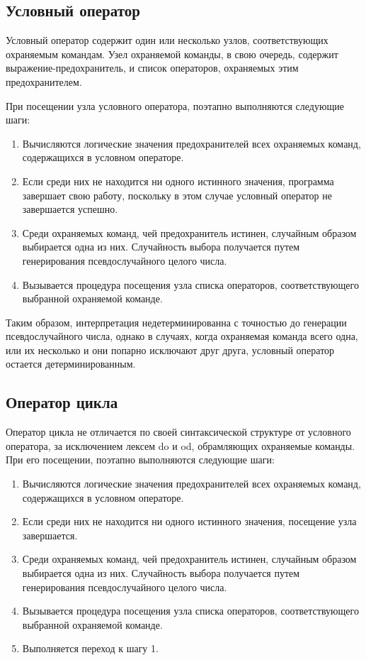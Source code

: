 \subsection{Условный оператор}
Условный оператор содержит один или несколько узлов, соответствующих охраняемым командам.
Узел охраняемой команды, в свою очередь, содержит выражение-предохранитель, и список операторов,
охраняемых этим предохранителем.

При посещении узла условного оператора, поэтапно выполняются следующие шаги:
\begin{enumerate}
    \item Вычисляются логические значения предохранителей всех охраняемых команд, содержащихся в условном операторе.
    \item Если среди них не находится ни одного истинного значения, программа завершает свою работу,
    поскольку в этом случае условный оператор не завершается успешно.
    \item Среди охраняемых команд, чей предохранитель истинен, случайным образом выбирается одна из них. Случайность
    выбора получается путем генерирования псевдослучайного целого числа. 
    \item Вызывается процедура посещения узла списка операторов, соответствующего выбранной охраняемой команде.
\end{enumerate}

Таким образом, интерпретация недетерминированна с точностью до генерации псевдослучайного числа, однако
в случаях, когда охраняемая команда всего одна, или их несколько и они попарно исключают друг друга, 
условный оператор остается детерминированным.

\subsection{Оператор цикла}
Оператор цикла не отличается по своей синтаксической структуре от условного оператора, за 
исключением лексем do и od, обрамляющих охраняемые команды. При его посещении, поэтапно выполняются
следующие шаги:
\begin{enumerate}
    \item Вычисляются логические значения предохранителей всех охраняемых команд, содержащихся в условном операторе.
    \item Если среди них не находится ни одного истинного значения, посещение узла завершается. 
    \item Среди охраняемых команд, чей предохранитель истинен, случайным образом выбирается одна из них. Случайность
    выбора получается путем генерирования псевдослучайного целого числа. 
    \item Вызывается процедура посещения узла списка операторов, соответствующего выбранной охраняемой команде.
    \item Выполняется переход к шагу 1.
\end{enumerate}

